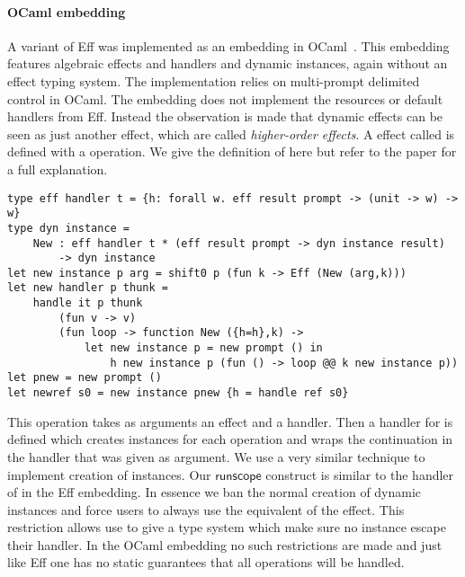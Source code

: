 \paragraph{OCaml embedding}
A variant of Eff was implemented as an embedding in OCaml~\cite{effdirectly}.
This embedding features algebraic effects and handlers and dynamic instances, again without an effect typing system.
The implementation relies on multi-prompt delimited control in OCaml.
The embedding does not implement the resources or default handlers from Eff.
Instead the observation is made that dynamic effects can be seen as just another effect, which are called \emph{higher-order effects}.
A effect called  is defined with a  operation.
We give the definition of  here but refer to the paper for a full explanation.
\newpage
\begin{verbatim}
type eff handler t = {h: forall w. eff result prompt -> (unit -> w) -> w}
type dyn instance =
	New : eff handler t * (eff result prompt -> dyn instance result)
		-> dyn instance
let new instance p arg = shift0 p (fun k -> Eff (New (arg,k)))
let new handler p thunk =
	handle it p thunk
		(fun v -> v)
		(fun loop -> function New ({h=h},k) ->
			let new instance p = new prompt () in
				h new instance p (fun () -> loop @@ k new instance p))
let pnew = new prompt ()
let newref s0 = new instance pnew {h = handle ref s0}
\end{verbatim}

This  operation takes as arguments an effect and a handler.
Then a handler for  is defined which creates instances for each  operation and wraps the continuation in the handler that was given as argument.
We use a very similar technique to implement creation of instances.
Our $\mathsf{runscope}$ construct is similar to the handler of  in the Eff embedding.
In essence we ban the normal creation of dynamic instances and force users to always use the equivalent of the  effect.
This restriction allows use to give a type system which make sure no instance escape their handler.
In the OCaml embedding no such restrictions are made and just like Eff one has no static guarantees that all operations will be handled.
\\\\
